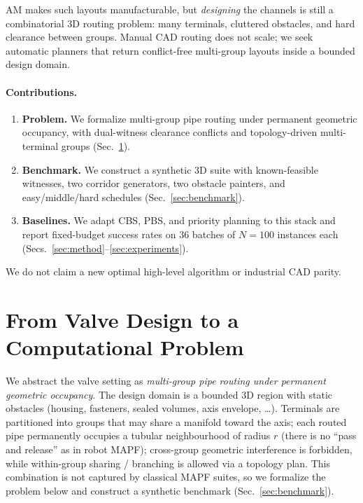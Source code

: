AM makes such layouts manufacturable, but \emph{designing} the channels is
still a combinatorial 3D routing problem: many terminals, cluttered obstacles,
and hard clearance between groups. Manual CAD routing does not scale; we seek
automatic planners that return conflict-free multi-group layouts inside a
bounded design domain.

\paragraph{Contributions.}
\begin{enumerate}
  \item \textbf{Problem.} We formalize multi-group pipe routing under permanent
        geometric occupancy, with dual-witness clearance conflicts and
        topology-driven multi-terminal groups (Sec.~\ref{sec:problem}).
  \item \textbf{Benchmark.} We construct a synthetic 3D suite with known-feasible
        witnesses, two corridor generators, two obstacle painters, and
        easy/middle/hard schedules (Sec.~\ref{sec:benchmark}).
  \item \textbf{Baselines.} We adapt CBS, PBS, and priority planning to this
        stack and report fixed-budget success rates on $36$ batches of
        $N{=}100$ instances each (Secs.~\ref{sec:method}--\ref{sec:experiments}).
\end{enumerate}
We do not claim a new optimal high-level algorithm or industrial CAD parity.

\section{From Valve Design to a Computational Problem}
\label{sec:problem}

We abstract the valve setting as \emph{multi-group pipe routing under permanent
geometric occupancy}. The design domain is a bounded 3D region with static
obstacles (housing, fasteners, sealed volumes, axis envelope, \ldots).
Terminals are partitioned into groups that may share a manifold toward the
axis; each routed pipe permanently occupies a tubular neighbourhood of radius
$r$ (there is no ``pass and release'' as in robot MAPF); cross-group geometric
interference is forbidden, while within-group sharing / branching is allowed
via a topology plan. This combination is not captured by classical MAPF
suites, so we formalize the problem below and construct a synthetic benchmark
(Sec.~\ref{sec:benchmark}).


